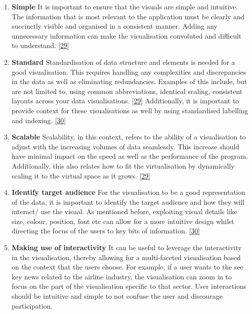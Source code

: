 \begin{enumerate}
\item \textbf{Simple}
It is important to ensure that the visuals are simple and intuitive. The information that is most relevant to the application must be clearly and succinctly visible and organised in a consistent manner. Adding any unnecessary information can make the visualisation convoluted and difficult to understand. \hyperlink{29}{[29]}

\item \textbf{Standard}
Standardisation of data structure and elements is needed for a good visualisation. This requires handling any complexities and discrepancies in the data as well as eliminating redundancies. Examples of this include, but are not limited to, using common abbreviations, identical scaling, consistent layouts across your data visualisations. \hyperlink{29}{[29]} Additionally, it is important to provide context for these visualisations as well by using standardised labelling and indexing. \hyperlink{30}{[30]}

\item \textbf{Scalable}
Scalability, in this context, refers to the ability of a visualisation to adjust with the increasing volumes of data seamlessly. This increase should have minimal impact on the speed as well as the performance of the program. Additionally, this also relates how to fit the virtualisation by dynamically scaling it to the virtual space as it grows. \hyperlink{29}{[29]}

\item \textbf{Identify target audience}
 For the visualisation to be a good representation of the data, it is important to identify the target audience and how they will interact/ use the visual. As mentioned before, exploiting visual details like size, colour, position, font etc can allow for a more intuitive design whilst directing the focus of the users to key bits of information. \hyperlink{30}{[30]}

\item \textbf{Making use of interactivity}
It can be useful to leverage the interactivity in the visualisation, thereby allowing for a multi-faceted visualisation based on the context that the users choose. For example, if a user wants to the see key news related to the airline industry, the visualisation can zoom in to focus on the part of the visualisation specific to that sector. User interactions should be intuitive and simple to not confuse the user and discourage participation. 

\end{enumerate}


